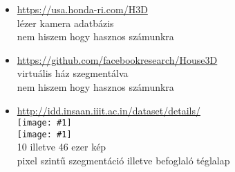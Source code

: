 \documentclass[12pt]{report}
\newcommand{\img}[1]{\texttt{[image: \#1]}}
\begin{document}
\begin{itemize}
	\item \url{https://usa.honda-ri.com/H3D}
	\\lézer kamera adatbázis
	\\nem hiszem hogy hasznos számunkra
	\item \url{https://github.com/facebookresearch/House3D}
	\\virtuális ház szegmentálva
	\\nem hiszem hogy hasznos számunkra
	\item \url{http://idd.insaan.iiit.ac.in/dataset/details/}
	\\\img{18}
	\\\img{19}
	\\10 illetve 46 ezer kép
	\\pixel szintű szegmentáció illetve befoglaló téglalap

	
	
\end{itemize}
\end{document}
